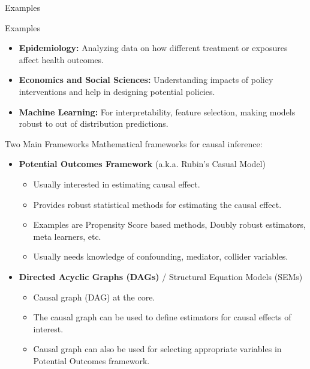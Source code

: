\documentclass[aspectratio=169]{beamer}
\begin{document}
\begin{frame}{Examples}
\end{frame}

\begin{frame}{Examples}
	\begin{itemize}
		\item \textbf{Epidemiology:} Analyzing data on how different treatment or exposures affect health outcomes.
		\item \textbf{Economics and Social Sciences:} Understanding impacts of policy interventions and help in designing potential policies.
		\item \textbf{Machine Learning:} For interpretability, feature selection, making models robust to out of distribution predictions.
	\end{itemize}
\end{frame}

\begin{frame}{Two Main Frameworks}
	Mathematical frameworks for causal inference:
	\vspace{0.5em}
	\begin{itemize}
		\item \textbf{Potential Outcomes Framework} (a.k.a. Rubin's Casual Model)
			\begin{itemize}
				\item Usually interested in estimating causal effect.
				\item Provides robust statistical methods for estimating the causal effect.
				\item Examples are Propensity Score based methods, Doubly robust estimators, meta learners, etc.
				\item Usually needs knowledge of confounding, mediator, collider variables.
			\end{itemize}
	\end{itemize}
	\vspace{1em}
	\begin{itemize}
		\item \textbf{Directed Acyclic Graphs (DAGs)} / Structural Equation Models (SEMs)
			\begin{itemize}
				\item Causal graph (DAG) at the core.
				\item The causal graph can be used to define estimators for causal effects of interest.
				\item Causal graph can also be used for selecting appropriate variables in Potential Outcomes framework.
			\end{itemize}
	\end{itemize}
\end{frame}
\end{document}
